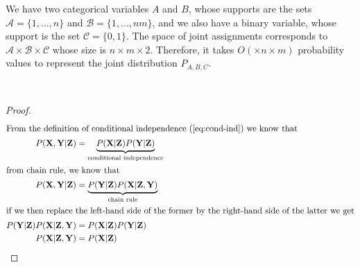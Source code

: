 \begin{Answer}[ref=ABC]
We have two categorical variables $A$ and $B$, whose supports are the sets $\mathcal A = \{1, \ldots, n\}$ and $\mathcal B = \{1, \ldots, nm\}$, and we also have a binary variable, whose support is the set $\mathcal C = \{0, 1\}$. The space of joint assignments corresponds to $\mathcal A \times \mathcal B \times \mathcal C$ whose size is $n \times m \times 2$. Therefore, it takes $O(\times n \times m)$ probability values to represent the joint distribution $P_{A,B,C}$.
\end{Answer}

~

\begin{Answer}[ref=cond-ind]

\begin{proof}
\begin{subequations}
\begin{align}
\intertext{From the definition of conditional independence  (\ref{eq:cond-ind})  we know that } 
P(\mathbf X, \mathbf Y| \mathbf Z) &= \underbrace{P(\mathbf X|\mathbf Z) P(\mathbf Y| \mathbf Z)}_{\text{conditional independence}} \\
\intertext{from chain rule, we know that}
P(\mathbf X, \mathbf Y| \mathbf Z) &= \underbrace{P(\mathbf Y|\mathbf Z) P(\mathbf X| \mathbf Z, \mathbf Y)}_{\text{chain rule}} \\
\intertext{if we then replace the left-hand side of the former by the right-hand side of the latter we get}
P(\mathbf Y|\mathbf Z) P(\mathbf X| \mathbf Z, \mathbf Y) &= P(\mathbf X|\mathbf Z) P(\mathbf Y| \mathbf Z) \\
P(\mathbf X| \mathbf Z, \mathbf Y) &= P(\mathbf X|\mathbf Z)
\end{align}
\end{subequations}
\end{proof}

\end{Answer}

~

